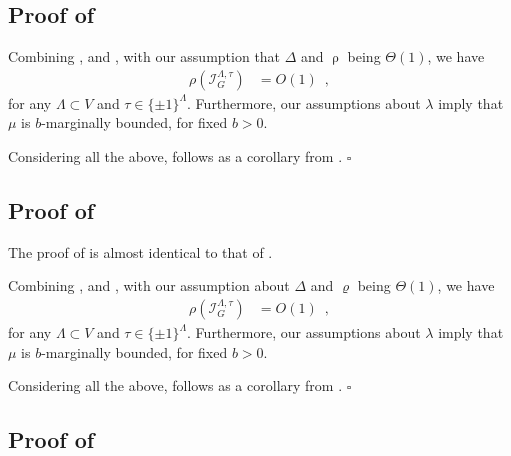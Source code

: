 \documentclass[11pt,reqno]{amsart}
\numberwithin{equation}{section}
\newcommand{\cI}{{\mathcal{I}}}
\newcommand{\maxDeg}{{\Delta}}
\newcommand{\infmatrix}{\cI}
\newcommand{\spradius}{{\rho}}
\newcommand{\aspradius}{{\varrho}}
\newcommand{\SingBound}{\uprho}
\begin{document}
\subsection{Proof of }
Combining ,  and , 
with our assumption that $\maxDeg$ and $\SingBound$ being $\Theta(1)$,
we have
\begin{align} \nonumber %
\spradius {\textstyle \left( \infmatrix^{\Lambda,\tau}_{G} \right)} &= O(1) \enspace, 
\end{align}
for any $\Lambda\subset V$ and $\tau\in \{\pm 1\}^{\Lambda}$.
%
Furthermore, our assumptions about $\lambda$ imply that $\mu$ is $b$-marginally bounded, 
for fixed $b>0$. 


Considering all the above,  follows as a corollary from .
%
\hfill $\square$




\subsection{Proof of } 
The proof of  is almost identical to that of .


Combining ,  and ,
with our assumption about $\maxDeg$ and $\aspradius$ being $\Theta(1)$,
%
we have
\begin{align} \nonumber %
\spradius \left( \infmatrix^{\Lambda,\tau}_{G} \right) &=O(1)\enspace,
\end{align}
%
for any $\Lambda\subset V$ and $\tau\in \{\pm 1\}^{\Lambda}$.
%
Furthermore, our assumptions about $\lambda$ imply that $\mu$ is $b$-marginally bounded, 
for fixed $b>0$. 


Considering all the above,  follows as a corollary from .
%
\hfill $\square$




\subsection{Proof of } 
 
\end{document}
